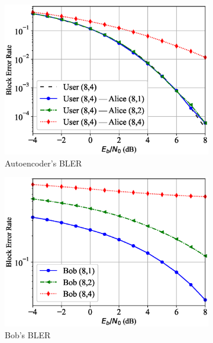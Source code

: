 \begin{figure}[tp!]
	\begin{subfigure}{0.28\textwidth}
		\includegraphics[width=\linewidth]{figs/covert_autoencoder_bler_awgn}
		\caption{Autoencoder's BLER}
		\label{fig:awgn_resutls_ae}
	\end{subfigure}
	\hspace*{\fill}
	\begin{subfigure}{0.28\textwidth}
		\includegraphics[width=\linewidth]{figs/bob_bler_awgn}
		\caption{Bob's BLER}	
		\label{fig:awgn_resutls_bob}
	\end{subfigure}
	\hspace*{\fill}
	\begin{subfigure}{0.28\textwidth}

\end{subfigure}
\end{figure}

